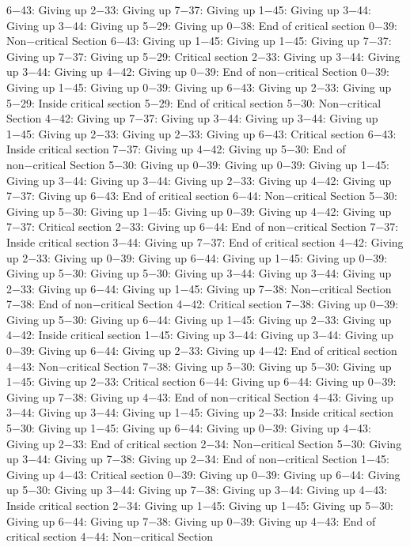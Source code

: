 6−43: Giving up
2−33: Giving up
7−37: Giving up
1−45: Giving up
3−44: Giving up
3−44: Giving up
5−29: Giving up
0−38: End of critical section
0−39: Non−critical Section
6−43: Giving up
1−45: Giving up
1−45: Giving up
7−37: Giving up
7−37: Giving up
5−29: Critical section
2−33: Giving up
3−44: Giving up
3−44: Giving up
4−42: Giving up
0−39: End of non−critical Section
0−39: Giving up
1−45: Giving up
0−39: Giving up
6−43: Giving up
2−33: Giving up
5−29: Inside critical section
5−29: End of critical section
5−30: Non−critical Section
4−42: Giving up
7−37: Giving up
3−44: Giving up
3−44: Giving up
1−45: Giving up
2−33: Giving up
2−33: Giving up
6−43: Critical section
6−43: Inside critical section
7−37: Giving up
4−42: Giving up
5−30: End of non−critical Section
5−30: Giving up
0−39: Giving up
0−39: Giving up
1−45: Giving up
3−44: Giving up
3−44: Giving up
2−33: Giving up
4−42: Giving up
7−37: Giving up
6−43: End of critical section
6−44: Non−critical Section
5−30: Giving up
5−30: Giving up
1−45: Giving up
0−39: Giving up
4−42: Giving up
7−37: Critical section
2−33: Giving up
6−44: End of non−critical Section
7−37: Inside critical section
3−44: Giving up
7−37: End of critical section
4−42: Giving up
2−33: Giving up
0−39: Giving up
6−44: Giving up
1−45: Giving up
0−39: Giving up
5−30: Giving up
5−30: Giving up
3−44: Giving up
3−44: Giving up
2−33: Giving up
6−44: Giving up
1−45: Giving up
7−38: Non−critical Section
7−38: End of non−critical Section
4−42: Critical section
7−38: Giving up
0−39: Giving up
5−30: Giving up
6−44: Giving up
1−45: Giving up
2−33: Giving up
4−42: Inside critical section
1−45: Giving up
3−44: Giving up
3−44: Giving up
0−39: Giving up
6−44: Giving up
2−33: Giving up
4−42: End of critical section
4−43: Non−critical Section
7−38: Giving up
5−30: Giving up
5−30: Giving up
1−45: Giving up
2−33: Critical section
6−44: Giving up
6−44: Giving up
0−39: Giving up
7−38: Giving up
4−43: End of non−critical Section
4−43: Giving up
3−44: Giving up
3−44: Giving up
1−45: Giving up
2−33: Inside critical section
5−30: Giving up
1−45: Giving up
6−44: Giving up
0−39: Giving up
4−43: Giving up
2−33: End of critical section
2−34: Non−critical Section
5−30: Giving up
3−44: Giving up
7−38: Giving up
2−34: End of non−critical Section
1−45: Giving up
4−43: Critical section
0−39: Giving up
0−39: Giving up
6−44: Giving up
5−30: Giving up
3−44: Giving up
7−38: Giving up
3−44: Giving up
4−43: Inside critical section
2−34: Giving up
1−45: Giving up
1−45: Giving up
5−30: Giving up
6−44: Giving up
7−38: Giving up
0−39: Giving up
4−43: End of critical section
4−44: Non−critical Section
